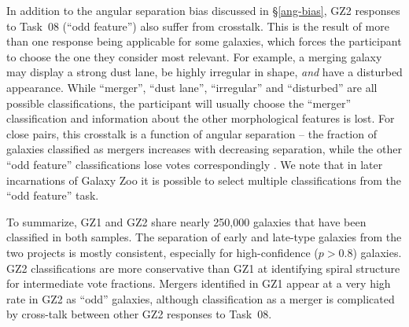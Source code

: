 \documentclass[useAMS,usenatbib]{mn2e}
\begin{document}
In addition to the angular separation bias discussed in \S\ref{ang-bias}, GZ2 responses to Task~08 (``odd feature'') also suffer from crosstalk. This is the result of more than one response being applicable for some galaxies, which forces the participant to choose the one they consider most relevant. For example, a merging galaxy may display a strong dust lane, be highly irregular in shape, {\em and} have a disturbed appearance. While ``merger'', ``dust lane'', ``irregular'' and ``disturbed'' are all possible classifications, the participant will usually choose the ``merger'' classification and information about the other morphological features is lost. For close pairs, this crosstalk is a function of angular separation -- the fraction of galaxies classified as mergers increases with decreasing separation, while the other ``odd feature'' classifications lose votes correspondingly \citep{cas13}. We note that in later incarnations of Galaxy Zoo it is possible to select multiple classifications from the ``odd feature'' task.


To summarize, GZ1 and GZ2 share nearly 250,000 galaxies that have been classified in both samples. The separation of early and late-type galaxies from the two projects is mostly consistent, especially for high-confidence ($p>0.8$) galaxies. GZ2 classifications are more conservative than GZ1 at identifying spiral structure for intermediate vote fractions. Mergers identified in GZ1 appear at a very high rate in GZ2 as ``odd'' galaxies, although classification as a merger is complicated by cross-talk between other GZ2 responses to Task~08. 
\end{document}
